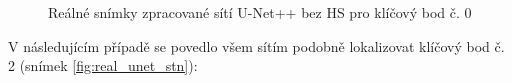 \begin{figure}[H]
\centering

\newcommand{\subfiguresize}{.15\textwidth}
\newcommand{\imagewidth}{1.0in}
\newcommand{\hspacesize}{.00in}

\newcommand{\insertimage}[1]{%
  \begin{minipage}{\imagewidth}
    \centering
    \texttt{[image: \#1]}
  \end{minipage}
}

\hspace{\hspacesize}%
\hspace{\hspacesize}%
\caption[Reálné snímky zpracované sítí U-Net++ bez HS]
{Reálné snímky zpracované sítí U-Net++ bez HS pro klíčový bod č. 0}
\label{fig:real_unet_ppa}
\end{figure}

V následujícím případě se povedlo všem sítím podobně lokalizovat klíčový bod č. 2 (snímek \ref{fig:real_unet_stn}):

